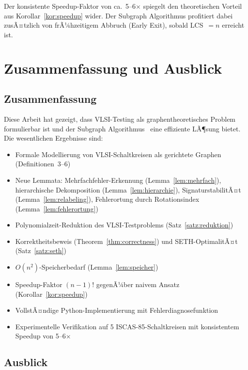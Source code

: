 ﻿\documentclass[a4paper,12pt]{article}
\theoremstyle{definition}
\begin{document}
Der konsistente Speedup-Faktor von ca.\ 5--6$\times$ spiegelt den
theoretischen Vorteil aus Korollar~\ref{kor:speedup} wider. Der
Subgraph Algorithmus profitiert dabei zusÃ¤tzlich von frÃ¼hzeitigem
Abbruch (Early Exit), sobald LCS~$=n$ erreicht ist.

\section{Zusammenfassung und Ausblick}
\label{sec:ausblick}

\subsection{Zusammenfassung}

Diese Arbeit hat gezeigt, dass VLSI-Testing als graphentheoretisches
Problem formulierbar ist und der Subgraph
Algorithmus~\cite{epp2026subgraph} eine effiziente LÃ¶sung bietet.
Die wesentlichen Ergebnisse sind:

\begin{itemize}
  \item Formale Modellierung von VLSI-Schaltkreisen als gerichtete
        Graphen (Definitionen~3--6)
  \item Neue Lemmata: Mehrfachfehler-Erkennung (Lemma~\ref{lem:mehrfach}),
        hierarchische Dekomposition (Lemma~\ref{lem:hierarchie}),
        SignaturstabilitÃ¤t (Lemma~\ref{lem:relabeling}),
        Fehlerortung durch Rotationsindex (Lemma~\ref{lem:fehlerortung})
  \item Polynomialzeit-Reduktion des VLSI-Testproblems
        (Satz~\ref{satz:reduktion})
  \item Korrektheitsbeweis (Theorem~\ref{thm:correctness}) und
        SETH-OptimalitÃ¤t (Satz~\ref{satz:seth})
  \item $O(n^2)$-Speicherbedarf (Lemma~\ref{lem:speicher})
  \item Speedup-Faktor $(n-1)!$ gegenÃ¼ber naivem Ansatz
        (Korollar~\ref{kor:speedup})
  \item VollstÃ¤ndige Python-Implementierung mit Fehlerdiagnosefunktion
  \item Experimentelle Verifikation auf 5 ISCAS-85-Schaltkreisen mit
        konsistentem Speedup von 5--6$\times$
\end{itemize}

\subsection{Ausblick}
\end{document}
